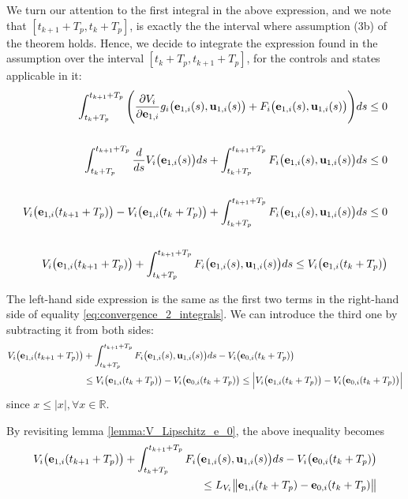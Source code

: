 \begin{gg_box}
  We turn our attention to the first integral in the above expression, and we
  note that $[t_{k+1} + T_p, t_k + T_p]$, is exactly the
  the interval where assumption (3b) of the theorem holds. Hence,
  we decide to integrate the expression found in the assumption over the
  interval $[t_k + T_p, t_{k+1} + T_p]$, for the controls and states applicable
  in it:
  \begin{align}
    \int_{t_k + T_p}^{t_{k+1} + T_p} \Bigg(\dfrac{\partial V_i}{\partial \bm{\mathbf{e}}_{1,i}} g_i\big(\bm{\mathbf{e}}_{1,i}(s), \bm{\mathbf{u}}_{1,i}(s)\big)
    + F_i\big(\bm{\mathbf{e}}_{1,i}(s), \bm{\mathbf{u}}_{1,i}(s)\big)\Bigg) ds \leq 0 \\\\
    \int_{t_k + T_p}^{t_{k+1} + T_p} \dfrac{d}{ds} V_i\big(\bm{\mathbf{e}}_{1,i}(s)\big) d s
    + \int_{t_k + T_p}^{t_{k+1} + T_p} F_i\big(\bm{\mathbf{e}}_{1,i}(s), \bm{\mathbf{u}}_{1,i}(s)\big) ds \leq 0 \\\\
    V_i\big(\bm{\mathbf{e}}_{1,i}(t_{k+1} + T_p)\big) - V_i\big(\bm{\mathbf{e}}_{1,i}(t_k + T_p)\big)
    + \int_{t_k + T_p}^{t_{k+1} + T_p} F_i\big(\bm{\mathbf{e}}_{1,i}(s), \bm{\mathbf{u}}_{1,i}(s)\big) ds \leq 0 \\\\
    V_i\big(\bm{\mathbf{e}}_{1,i}(t_{k+1} + T_p)\big)
    + \int_{t_k + T_p}^{t_{k+1} + T_p} F_i\big(\bm{\mathbf{e}}_{1,i}(s), \bm{\mathbf{u}}_{1,i}(s)\big) ds \leq V_i\big(\bm{\mathbf{e}}_{1,i}(t_k + T_p)\big)
  \end{align}

  The left-hand side expression is the same as the first two terms in the
  right-hand side of equality \eqref{eq:convergence_2_integrals}. We can
  introduce the third one by subtracting it from both sides:
  \begin{align}
    V_i\big(\bm{\mathbf{e}}_{1,i}(t_{k+1} + T_p)\big)
    &+ \int_{t_k + T_p}^{t_{k+1} + T_p} F_i\big(\bm{\mathbf{e}}_{1,i}(s), \bm{\mathbf{u}}_{1,i}(s)\big) ds
    - V_i\big(\bm{\mathbf{e}}_{0,i}(t_k + T_p)\big) \\
    &\leq V_i\big(\bm{\mathbf{e}}_{1,i}(t_k + T_p)\big)
    - V_i\big(\bm{\mathbf{e}}_{0,i}(t_k + T_p)\big)
    \leq \Big|V_i\big(\bm{\mathbf{e}}_{1,i}(t_k + T_p)\big)
    - V_i\big(\bm{\mathbf{e}}_{0,i}(t_k + T_p)\big)\Big|
  \end{align}
  since $x \leq |x|, \forall x \in \mathbb{R}$.

  By revisiting lemma \eqref{lemma:V_Lipschitz_e_0}, the above inequality
  becomes
  \begin{align}
    V_i\big(\bm{\mathbf{e}}_{1,i}(t_{k+1} + T_p)\big)
    + \int_{t_k + T_p}^{t_{k+1} + T_p} F_i\big(\bm{\mathbf{e}}_{1,i}(s), \bm{\mathbf{u}}_{1,i}(s)\big) ds
    - V_i\big(\bm{\mathbf{e}}_{0,i}(t_k + T_p)\big) \\
    \leq L_{V_i} \big\|\bm{\mathbf{e}}_{1,i}(t_k + T_p) - \bm{\mathbf{e}}_{0,i}(t_k + T_p)\big\|
  \end{align}


\end{gg_box}
